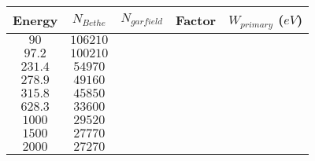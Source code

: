 \begin{table}[ht]
  \centering
  \caption[]
  {}
  \label{chap3:GarfieldBethe}
  \begin{tabular}{ccccc}
    \toprule
    Energy    & \(N_{Bethe}\) & \(N_{garfield}\) & Factor & \(W_{primary}\) (\(eV\)) \\
    \midrule
    \(90\)    & \(106210\)    & \(\)             & \(\)   & \(\)                     \\
    \(97.2\)  & \(100210\)    & \(\)             & \(\)   & \(\)                     \\
    \(231.4\) & \(54970\)     & \(\)             & \(\)   & \(\)                     \\
    \(278.9\) & \(49160\)     & \(\)             & \(\)   & \(\)                     \\
    \(315.8\) & \(45850\)     & \(\)             & \(\)   & \(\)                     \\
    \(628.3\) & \(33600\)     & \(\)             & \(\)   & \(\)                     \\
    \(1000\)  & \(29520\)     & \(\)             & \(\)   & \(\)                     \\
    \(1500\)  & \(27770\)     & \(\)             & \(\)   & \(\)                     \\
    \(2000\)  & \(27270\)     & \(\)             & \(\)   & \(\)                     \\
    \bottomrule
  \end{tabular}
\end{table}